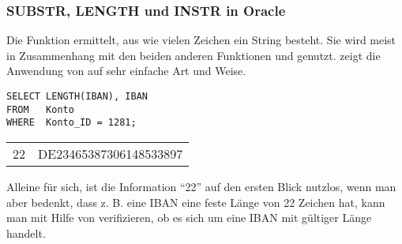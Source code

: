         \subsubsection{SUBSTR, LENGTH und INSTR in Oracle}
          Die Funktion  ermittelt, aus wie vielen Zeichen
          ein String besteht. Sie wird meist in Zusammenhang mit den beiden
          anderen Funktionen  und 
          genutzt.  zeigt die Anwendung von
           auf sehr einfache Art und Weise.
          \begin{lstlisting}[language=oracle_sql,caption={Die \languageorasql{LENGTH}-Funktion},label=sql03_04]
SELECT LENGTH(IBAN), IBAN
FROM   Konto
WHERE  Konto_ID = 1281;
          \end{lstlisting}
          \begin{center}
            \begin{small}
              \tablehead{}
              \tabletail {
              }
              \begin{oraclesql}
                \begin{supertabular}{rl}
                  22 & DE23465387306148533897 \\
                \end{supertabular}
              \end{oraclesql}
            \end{small}
          \end{center}
          Alleine f\"ur sich, ist die Information \enquote{22} auf den
          ersten Blick nutzlos, wenn man aber bedenkt, dass z. B. eine IBAN
          eine feste L\"ange von 22 Zeichen hat, kann man mit Hilfe von
           verifizieren, ob es sich um eine IBAN mit
          g\"ultiger L\"ange handelt.

